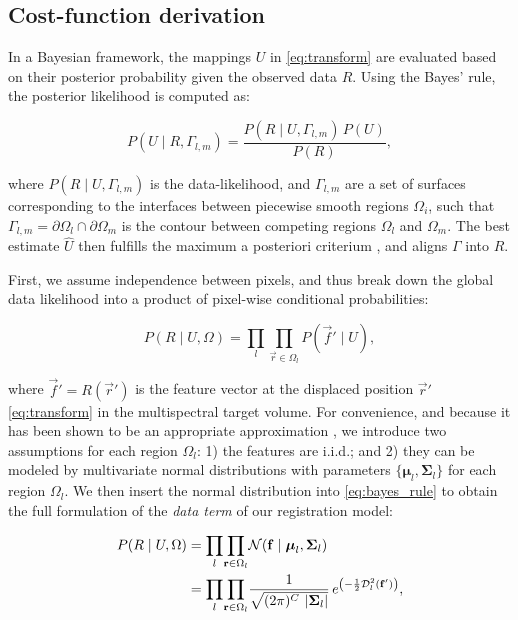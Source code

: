 \subsection{Cost-function derivation}\label{sec:methods_map}

In a Bayesian framework, the mappings $U$ in \eqref{eq:transform} are
  evaluated based on their posterior probability given the observed data
  $R$.
Using the Bayes' rule, the posterior likelihood is computed as:

  \begin{equation}
  P(U \mid R,\Gamma_{l,m}) = \frac{P(R \mid U,\Gamma_{l,m})\, P(U)}{P(R)},
  \label{eq:bayes_rule}
  \end{equation}

  where $P(R \mid U,\Gamma_{l,m})$ is the data-likelihood, and
  $\Gamma_{l,m}$ are a set of surfaces corresponding to the interfaces
  between piecewise smooth regions $\Omega_i$, such that
  $\Gamma_{l,m} = \partial \Omega_l \cap \partial \Omega_m$ is the
  contour between competing regions $\Omega_l$ and $\Omega_m$.
The best estimate $\hat{U}$ then fulfills the maximum a posteriori criterium
  \citep{bishop_pattern_2006}, and aligns $\Gamma$ into $R$.

First, we assume independence between pixels, and thus break down the
  global data likelihood into a product of pixel-wise conditional probabilities:

  \begin{equation}
  P(R \mid U,\Omega) = \underset{l}{\prod} \underset{\vec{r}\in \Omega_l}{\prod}
    P\left( \vec{f}' \mid U \right),
  \label{eq:bayes_aposteriori}
  \end{equation}

  where $\vec{f}' = R(\vec{r}')$ is the feature vector at the displaced
  position $\vec{r}'$ \eqref{eq:transform} in the multispectral target
  volume.
For convenience, and because it has been shown to be an appropriate approximation
  \citep{leemput_automated_1999,cuadra_comparison_2005}, we introduce two assumptions for each
  region $\Omega_l$:
  1) the features are i.i.d.; and 2) they can be modeled by multivariate normal
  distributions with parameters $\lbrace \boldsymbol{\mu}_l, \boldsymbol{\Sigma}_{l} \rbrace$
  for each region $\Omega_l$.
We then insert the normal distribution into \eqref{eq:bayes_rule} to obtain the full
  formulation of the \emph{data term} of our registration model:

 	\begin{align}
  P( R \mid U, \Omega ) &= \underset{l}{\prod} \underset{\vec{r} \in \Omega_l}{\prod}
  \mathcal{N} ( \vec{f} \mid \boldsymbol{\mu}_l, \boldsymbol{\Sigma}_{l} ) \notag\\
  &= \underset{l}{\prod} \underset{\vec{r} \in \Omega_l}{\prod} \frac{1}{ \sqrt{(2\pi)^{C}\,\left|\boldsymbol{\Sigma}_{l}\right|}}\,{e^{\left(-\frac{1}{2}
  \mdist{f'}{l} \right)}},
  \label{eq:pdf}
  \end{align}

